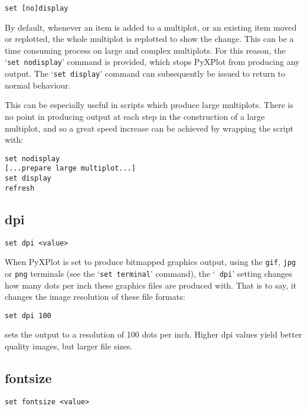 \documentclass[a4paper,onecolumn,11pt]{book}
\begin{document}
\begin{verbatim}
set [no]display
\end{verbatim}

By default, whenever an item is added to a multiplot, or an existing item moved
or replotted, the whole multiplot is replotted to show the change. This can be
a time consuming process on large and complex multiplots. For this reason, the
`{\tt set nodisplay}' command is provided, which stops PyXPlot from producing any
output. The `{\tt set display}' command can subsequently be issued to return to
normal behaviour.

This can be especially useful in scripts which produce large multiplots. There
is no point in producing output at each step in the construction of a large
multiplot, and so a great speed increase can be achieved by wrapping the script
with:

\begin{verbatim}
set nodisplay 
[...prepare large multiplot...] 
set display 
refresh
\end{verbatim}


\subsection{dpi}

\begin{verbatim}
set dpi <value>
\end{verbatim}

When PyXPlot is set to produce bitmapped graphics output, using the {\tt gif},
{\tt jpg} or {\tt png} terminals (see the `{\tt set terminal}' command), the `{\tt
dpi}' setting changes how many dots per inch these graphics files are produced
with. That is to say, it changes the image resolution of these file formats:

\begin{verbatim}
set dpi 100
\end{verbatim}

\noindent sets the output to a resolution of 100 dots per inch. Higher dpi
values yield better quality images, but larger file sizes.

\subsection{fontsize}

\begin{verbatim}
set fontsize <value>
\end{verbatim}
\end{document}
